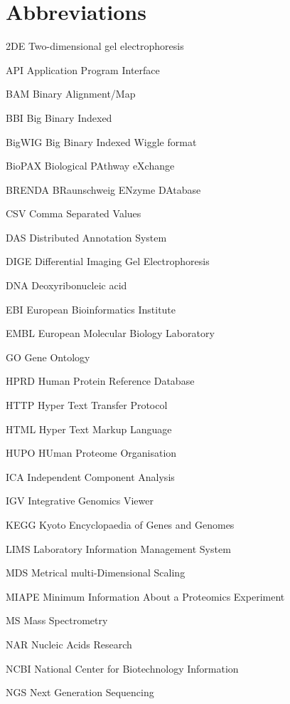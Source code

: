 \chapter*{Abbreviations}
\begin{abbreviations}
\setlength\itemsep{-0.5em}
	\item[2DE] Two-dimensional gel electrophoresis
	\item[API] Application Program Interface
	\item[BAM] Binary Alignment/Map 
	\item[BBI] Big Binary Indexed
	\item[BigWIG] Big Binary Indexed Wiggle format
	\item[BioPAX] Biological PAthway eXchange
	\item[BRENDA] BRaunschweig ENzyme DAtabase
	\item[CSV]  Comma Separated Values 
	\item[DAS] Distributed Annotation System 
	\item[DIGE] Differential Imaging Gel Electrophoresis
	\item[DNA]Deoxyribonucleic acid
	\item[EBI] European Bioinformatics Institute
	\item[EMBL] European Molecular Biology Laboratory
	\item[GO] Gene Ontology
	\item[HPRD] Human Protein Reference Database
	\item[HTTP] Hyper Text Transfer Protocol
	\item[HTML] Hyper Text Markup Language
	\item[HUPO] HUman Proteome Organisation 
	\item[ICA] Independent Component Analysis   
	\item[IGV] Integrative Genomics Viewer
	\item[KEGG] Kyoto Encyclopaedia of Genes and Genomes
	\item[LIMS] Laboratory Information Management System
	\item[MDS] Metrical multi-Dimensional Scaling
	\item[MIAPE] Minimum Information About a Proteomics Experiment
	\item[MS] Mass Spectrometry
	\item[NAR] Nucleic Acids Research 
	\item[NCBI] National Center for Biotechnology Information
	\item[NGS] Next Generation Sequencing

\end{abbreviations}
